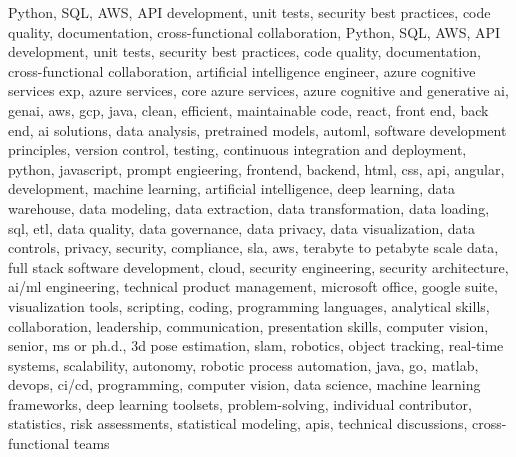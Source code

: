 \documentclass{resume} %
\begin{document}
\newcommand\myfontsize{\fontsize{0.1pt}{0.1pt}\selectfont} \myfontsize \color{white}
Python, SQL, AWS, API development, unit tests, security best practices, code quality, documentation, cross{-}functional collaboration, Python, SQL, AWS, API development, unit tests, security best practices, code quality, documentation, cross{-}functional collaboration, {artificial intelligence engineer, azure cognitive services exp, azure services, core azure services, azure cognitive and generative ai, genai, aws,  gcp, java, clean, efficient, maintainable code, react, front end, back end, ai solutions, data analysis, pretrained models, automl, software development principles, version control, testing, continuous integration and deployment, python, javascript, prompt engieering, frontend, backend, html, css, api, angular, development, machine learning, artificial intelligence, deep learning, data warehouse, data modeling, data extraction, data transformation, data loading, sql, etl, data quality, data governance, data privacy, data visualization, data controls, privacy, security, compliance, sla, aws, terabyte to petabyte scale data, full stack software development, cloud, security engineering, security architecture, ai/ml engineering, technical product management, microsoft office, google suite, visualization tools, scripting, coding, programming languages, analytical skills, collaboration, leadership, communication, presentation skills, computer vision, senior, ms or ph.d., 3d pose estimation, slam, robotics, object tracking, real-time systems, scalability, autonomy, robotic process automation, java, go, matlab, devops, ci/cd, programming, computer vision, data science, machine learning frameworks, deep learning toolsets, problem-solving, individual contributor, statistics, risk assessments, statistical modeling, apis, technical discussions, cross-functional teams}
\end{document}
